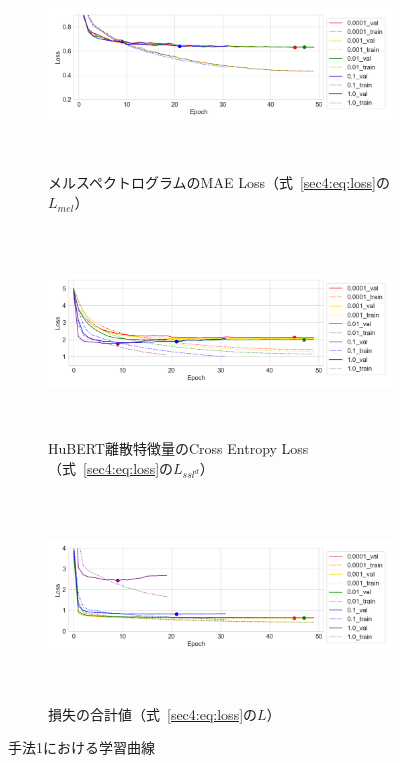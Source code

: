 \documentclass[12pt]{jarticle}
\numberwithin{equation}{section}    %
\numberwithin{figure}{section}      %
\numberwithin{table}{section}      %
\begin{document}
\begin{figure}[bt]
    \centering
    \begin{subfigure}{\linewidth}
        \centering
        \includegraphics[height=55mm]{./figure/sec4/learning_curves/0/mel_loss.png}
        \caption{メルスペクトログラムのMAE Loss（式~\eqref{sec4:eq:loss}の$L_{mel}$）}
        \label{sec4:fig:learning_curve_method_1_val_mel_loss}
    \end{subfigure}
    \begin{subfigure}{\linewidth}
        \centering
        \includegraphics[height=55mm]{./figure/sec4/learning_curves/0/ssl_feature_cluster_loss.png}
        \caption{HuBERT離散特徴量のCross Entropy Loss（式~\eqref{sec4:eq:loss}の$L_{ssl^{d}}$）}
        \label{sec4:fig:learning_curve_method_1_val_ssl_feature_cluster_loss}
    \end{subfigure}
    \begin{subfigure}{\linewidth}
        \centering
        \includegraphics[height=55mm]{./figure/sec4/learning_curves/0/total_loss.png}
        \caption{損失の合計値（式~\eqref{sec4:eq:loss}の$L$）}
        \label{sec4:fig:learning_curve_method_1_val_total_loss}
    \end{subfigure}
    \caption{手法1における学習曲線}
    \label{sec4:fig:learning_curve_method_1_val_losses}
\end{figure}
\end{document}
